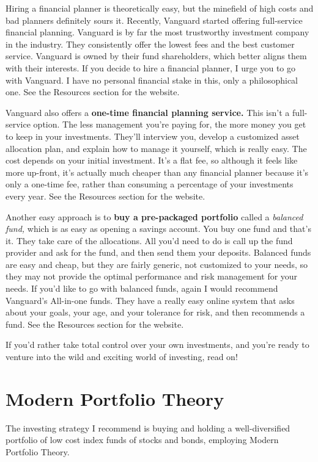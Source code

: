 Hiring a financial planner is theoretically easy, but the minefield of high costs and bad planners definitely sours it. Recently, Vanguard started offering full-service financial planning. Vanguard is by far the most trustworthy investment company in the industry. They consistently offer the lowest fees and the best customer service. Vanguard is owned by their fund shareholders, which better aligns them with their interests. If you decide to hire a financial planner, I urge you to go with Vanguard. I have no personal financial stake in this, only a philosophical one. See the Resources section for the website.

Vanguard also offers a \textbf{one-time financial planning service.} This isn't a full-service option. The less management you're paying for, the more money you get to keep in your investments. They'll interview you, develop a customized asset allocation plan, and explain how to manage it yourself, which is really easy. The cost depends on your initial investment. It's a flat fee, so although it feels like more up-front, it's actually much cheaper than any financial planner because it's only a one-time fee, rather than consuming a percentage of your investments every year. See the Resources section for the website.

Another easy approach is to \textbf{buy a pre-packaged portfolio} called a \emph{balanced fund,} which is as easy as opening a savings account. You buy one fund and that's it. They take care of the allocations. All you'd need to do is call up the fund provider and ask for the fund, and then send them your deposits. Balanced funds are easy and cheap, but they are fairly generic, not customized to your needs, so they may not provide the optimal performance and risk management for your needs. If you'd like to go with balanced funds, again I would recommend Vanguard's All-in-one funds. They have a really easy online system that asks about your goals, your age, and your tolerance for risk, and then recommends a fund. See the Resources section for the website.

If you'd rather take total control over your own investments, and you're ready to venture into the wild and exciting world of investing, read on!

\section{Modern Portfolio Theory}
The investing strategy I recommend is buying and holding a well-diversified portfolio of low cost index funds of stocks and bonds, employing Modern Portfolio Theory.

